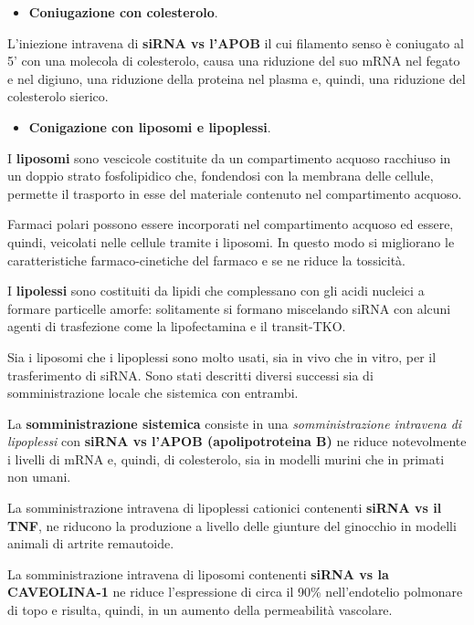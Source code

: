 \documentclass[]{article}
\begin{document}
\begin{itemize}
\itemsep1pt\parskip0pt
\item
  \textbf{Coniugazione con colesterolo}.
\end{itemize}

L'iniezione intravena di \textbf{siRNA vs l'APOB} il cui filamento senso
è coniugato al 5' con una molecola di colesterolo, causa una riduzione
del suo mRNA nel fegato e nel digiuno, una riduzione della proteina nel
plasma e, quindi, una riduzione del colesterolo sierico.

\begin{itemize}
\itemsep1pt\parskip0pt
\item
  \textbf{Conigazione con liposomi e lipoplessi}.
\end{itemize}

I \textbf{liposomi} sono vescicole costituite da un compartimento
acquoso racchiuso in un doppio strato fosfolipidico che, fondendosi con
la membrana delle cellule, permette il trasporto in esse del materiale
contenuto nel compartimento acquoso.

Farmaci polari possono essere incorporati nel compartimento acquoso ed
essere, quindi, veicolati nelle cellule tramite i liposomi. In questo
modo si migliorano le caratteristiche farmaco-cinetiche del farmaco e se
ne riduce la tossicità.

I \textbf{lipolessi} sono costituiti da lipidi che complessano con gli
acidi nucleici a formare particelle amorfe: solitamente si formano
miscelando siRNA con alcuni agenti di trasfezione come la lipofectamina
e il transit-TKO.

Sia i liposomi che i lipoplessi sono molto usati, sia in vivo che in
vitro, per il trasferimento di siRNA. Sono stati descritti diversi
successi sia di somministrazione locale che sistemica con entrambi.

La \textbf{somministrazione sistemica} consiste in una
\emph{somministrazione intravena di lipoplessi} con \textbf{siRNA vs
l'APOB (apolipotroteina B)} ne riduce notevolmente i livelli di mRNA e,
quindi, di colesterolo, sia in modelli murini che in primati non umani.

La somministrazione intravena di lipoplessi cationici contenenti
\textbf{siRNA vs il TNF}, ne riducono la produzione a livello delle
giunture del ginocchio in modelli animali di artrite remautoide.

La somministrazione intravena di liposomi contenenti \textbf{siRNA vs la
CAVEOLINA-1} ne riduce l'espressione di circa il 90\% nell'endotelio
polmonare di topo e risulta, quindi, in un aumento della permeabilità
vascolare.
\end{document}
